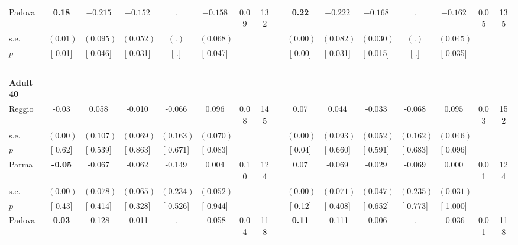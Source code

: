 \begin{longtable}{L{8em} c c c c c c c p{1em} c c c c c c c}
\quad \quad \quad Padova& \textbf{     0.18} & $ \mathbf{   -0.215}$ & $ \mathbf{   -0.152}$ &         . & $ \mathbf{   -0.158}$ &      0.09 &       132 & & \textbf{     0.22} & $ \mathbf{   -0.222}$ & $ \mathbf{   -0.168}$ &         . & $ \mathbf{   -0.162}$ &      0.05 &       135  \\*
\quad \quad \quad \quad s.e.& $ (     0.01)$ & $ (    0.095)$ & $ (    0.052)$ & $ (        .)$ & $ (    0.068)$ & & & & $ (     0.00)$ & $ (    0.082)$ & $ (    0.030)$ & $ (        .)$ & $ (    0.045)$ & &  \\*
\quad \quad \quad \quad $ p$ & [     0.01] & [    0.046] & [    0.031] & [        .] & [    0.047] & & & & [     0.00] & [    0.031] & [    0.015] & [        .] & [    0.035] & &  \\[1em]
~\\[1em]
\quad \quad \textbf{Adult 40} & & & & & & & & & & & & & & & \\* 
\quad \quad \quad Reggio& -0.03 &     0.058 &    -0.010 &    -0.066 & $ \mathbf{    0.096}$ &      0.08 &       145 & & 0.07 &     0.044 &    -0.033 &    -0.068 & $ \mathbf{    0.095}$ &      0.03 &       152  \\*
\quad \quad \quad \quad s.e.& $ (     0.00)$ & $ (    0.107)$ & $ (    0.069)$ & $ (    0.163)$ & $ (    0.070)$ & & & & $ (     0.00)$ & $ (    0.093)$ & $ (    0.052)$ & $ (    0.162)$ & $ (    0.046)$ & &  \\*
\quad \quad \quad \quad $ p$ & [     0.62] & [    0.539] & [    0.863] & [    0.671] & [    0.083] & & & & [     0.04] & [    0.660] & [    0.591] & [    0.683] & [    0.096] & &  \\[1em]
\quad \quad \quad Parma& \textbf{    -0.05} &    -0.067 &    -0.062 &    -0.149 &     0.004 &      0.10 &       124 & & 0.07 &    -0.069 &    -0.029 &    -0.069 &     0.000 &      0.01 &       124  \\*
\quad \quad \quad \quad s.e.& $ (     0.00)$ & $ (    0.078)$ & $ (    0.065)$ & $ (    0.234)$ & $ (    0.052)$ & & & & $ (     0.00)$ & $ (    0.071)$ & $ (    0.047)$ & $ (    0.235)$ & $ (    0.031)$ & &  \\*
\quad \quad \quad \quad $ p$ & [     0.43] & [    0.414] & [    0.328] & [    0.526] & [    0.944] & & & & [     0.12] & [    0.408] & [    0.652] & [    0.773] & [    1.000] & &  \\[1em]
\quad \quad \quad Padova& \textbf{     0.03} &    -0.128 &    -0.011 &         . &    -0.058 &      0.04 &       118 & & \textbf{     0.11} &    -0.111 &    -0.006 &         . &    -0.036 &      0.01 &       118  \\*

\end{longtable}
